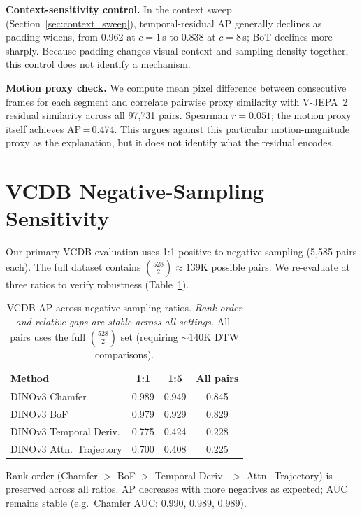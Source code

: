 \documentclass{article}
\theoremstyle{remark}
\begin{document}
\textbf{Context-sensitivity control.} In the context sweep (Section~\ref{sec:context_sweep}), temporal-residual AP generally declines as padding widens, from 0.962 at $c\!=\!1$\,s to 0.838 at $c\!=\!8$\,s; BoT declines more sharply. Because padding changes visual context and sampling density together, this control does not identify a mechanism.

\textbf{Motion proxy check.} We compute mean pixel difference between consecutive frames for each segment and correlate pairwise proxy similarity with V-JEPA~2 residual similarity across all 97{,}731 pairs. Spearman $r = 0.051$; the motion proxy itself achieves AP\,=\,0.474. This argues against this particular motion-magnitude proxy as the explanation, but it does not identify what the residual encodes.

\section{VCDB Negative-Sampling Sensitivity}
\label{sec:neg_sampling}

Our primary VCDB evaluation uses 1:1 positive-to-negative sampling (5{,}585 pairs each). The full dataset contains $\binom{528}{2} \approx 139$K possible pairs. We re-evaluate at three ratios to verify robustness (Table~\ref{tab:neg_sensitivity}).

\begin{table}[h]
\centering
\caption{VCDB AP across negative-sampling ratios. \emph{Rank order and relative gaps are stable across all settings.} All-pairs uses the full $\binom{528}{2}$ set (requiring ${\sim}140$K DTW comparisons).}
\label{tab:neg_sensitivity}
\begin{tabular}{lccc}
\toprule
\textbf{Method} & \textbf{1:1} & \textbf{1:5} & \textbf{All pairs} \\
\midrule
DINOv3 Chamfer           & 0.989 & 0.949 & 0.845 \\
DINOv3 BoF               & 0.979 & 0.929 & 0.829 \\
DINOv3 Temporal Deriv.   & 0.775 & 0.424 & 0.228 \\
DINOv3 Attn.\ Trajectory & 0.700 & 0.408 & 0.225 \\
\bottomrule
\end{tabular}
\begin{flushleft}
\small Rank order (Chamfer $>$ BoF $>$ Temporal Deriv.\ $>$ Attn.\ Trajectory) is preserved across all ratios. AP decreases with more negatives as expected; AUC remains stable (e.g.\ Chamfer AUC: 0.990, 0.989, 0.989).
\end{flushleft}
\end{table}
\end{document}
